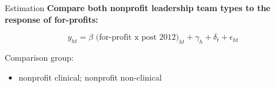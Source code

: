 \documentclass[notes,11pt, aspectratio=169]{beamer}
\begin{document}
\begin{frame}{Estimation}
\large
    \textbf{Compare both nonprofit leadership team types to the response of for-profits:}

    \vspace{5mm}\large
    \begin{equation*}
    y_{ht} = \beta \text{ (for-profit x post 2012)}_{ht} + \gamma_{h} + \delta_t + \epsilon_{ht}
    \end{equation*}

    \vspace{10mm}

    Comparison group:
    \begin{itemize}
        \item nonprofit clinical; nonprofit non-clinical
    \end{itemize}

\end{frame}
\end{document}
